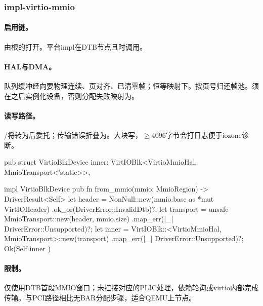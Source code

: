 
\subsubsection{impl-virtio-mmio}

\paragraph{启用链。}由根的打开。平台impl在DTB节点且时调用。

\paragraph{HAL与DMA。}队列缓冲经向要物理连续、页对齐、已清零帧；恒等映射下。按页号归还帧池。须在之后实例化设备，否则分配失败映射为。

\paragraph{读写路径。}/将转为后委托；传输错误折叠为。大块写，$\geq$4096字节会打日志便于iozone诊断。

\begin{rustcode}
pub struct VirtioBlkDevice {
    inner: VirtIOBlk<VirtioMmioHal, MmioTransport<'static>>,
}

impl VirtioBlkDevice {
    pub fn from_mmio(mmio: MmioRegion) -> DriverResult<Self> {
        let header = NonNull::new(mmio.base as *mut VirtIOHeader)
            .ok_or(DriverError::InvalidDtb)?;
        let transport = unsafe { MmioTransport::new(header, mmio.size) }
            .map_err(|_| DriverError::Unsupported)?;
        let inner = VirtIOBlk::<VirtioMmioHal, MmioTransport>::new(transport)
            .map_err(|_| DriverError::Unsupported)?;
        Ok(Self { inner })
    }
}
\end{rustcode}

\paragraph{限制。}仅使用DTB首段MMIO窗口；未挂接对应的PLIC处理，依赖轮询或virtio内部完成传输。与PCI路径相比无BAR分配步骤，适合QEMU上节点。
